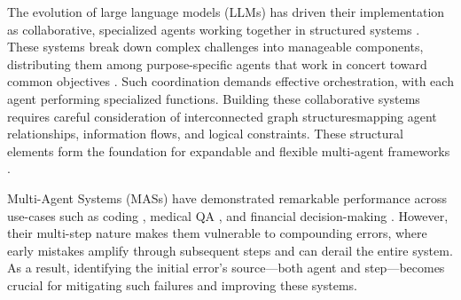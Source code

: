 \documentclass{article}
\begin{document}

The evolution of large language models (LLMs) has driven their implementation as collaborative, specialized agents working together in structured systems \cite{guo2024large, li2025review}. These systems break down complex challenges into manageable components, distributing them among purpose-specific agents that work in concert toward common objectives \cite{chen2024internet, li2023camel}. Such coordination demands effective orchestration, with each agent performing specialized functions. Building these collaborative systems requires careful consideration of interconnected graph structures\textemdash mapping agent relationships, information flows, and logical constraints. These structural elements form the foundation for expandable and flexible multi-agent frameworks \cite{zhou2025multi}.


Multi-Agent Systems (MASs) have demonstrated remarkable performance across use-cases such as coding \cite{hong2023metagpt}, medical QA \cite{kim2024mdagents}, and financial decision-making \cite{yu2024fincon}. However, their multi-step nature makes them vulnerable to compounding errors, where early mistakes amplify through subsequent steps and can derail the entire system. As a result, identifying the initial error's source—both agent and step—becomes crucial for mitigating such failures and improving these systems.
\end{document}
